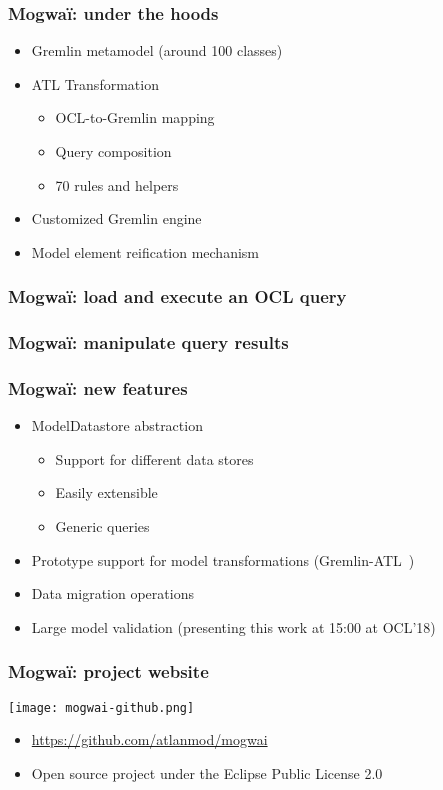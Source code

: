 \begin{frame}[c]\frametitle{Mogwa\"i: under the hoods}
	\begin{itemize}
	\item Gremlin metamodel (around 100 classes)
	\item ATL Transformation
	\begin{itemize}
		\item OCL-to-Gremlin mapping
		\item Query composition
		\item 70 rules and helpers
	\end{itemize}
	\item Customized Gremlin engine
	\item Model element reification mechanism
	\end{itemize}
\end{frame}

\begin{frame}[c]\frametitle{Mogwa\"i: load and execute an OCL query}

\end{frame}

\begin{frame}[c]\frametitle{Mogwa\"i: manipulate query results}

\end{frame}

\begin{frame}[c]\frametitle{Mogwa\"i: new features}
\begin{itemize}
	\item ModelDatastore abstraction
		\begin{itemize}
		\item Support for different data stores
		\item Easily extensible
		\item Generic queries
		\end{itemize}
	\item Prototype support for model transformations (Gremlin-ATL~\cite{})
	\item Data migration operations
	\item Large model validation (presenting this work at 15:00 at OCL'18)
\end{itemize}

\end{frame}

\begin{frame}[c]\frametitle{Mogwa\"i: project website}
  \begin{center}
    \texttt{[image: mogwai-github.png]}
  \end{center}
	
  \begin{itemize}
  \item \url{https://github.com/atlanmod/mogwai}
  \item Open source project under the Eclipse Public License 2.0
  \end{itemize}
\end{frame}

